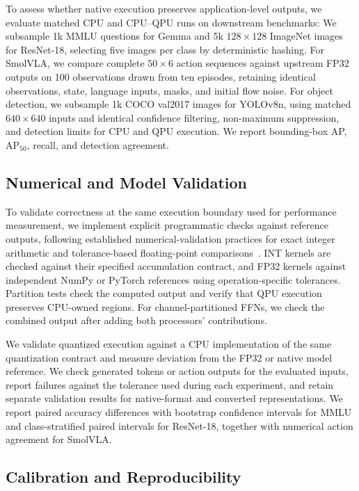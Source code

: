 \documentclass[sigplan,screen,review]{acmart}
\begin{document}
To assess whether native execution preserves application-level outputs, we evaluate matched CPU and CPU--QPU runs on downstream benchmarks: We subsample 1k MMLU questions for Gemma and 5k $128\times128$ ImageNet images for ResNet-18, selecting five images per class by deterministic hashing. For SmolVLA, we compare complete $50\times6$ action sequences against upstream FP32 outputs on 100 observations drawn from ten episodes, retaining identical observations, state, language inputs, masks, and initial flow noise. For object detection, we subsample 1k COCO val2017 images for YOLOv8n, using matched $640\times640$ inputs and identical confidence filtering, non-maximum suppression, and detection limits for CPU and QPU execution. We report bounding-box AP, AP$_{50}$, recall, and detection agreement.



\subsection{Numerical and Model Validation}

To validate correctness at the same execution boundary used for performance measurement, we implement explicit programmatic checks against reference outputs, following established numerical-validation practices for exact integer arithmetic and tolerance-based floating-point comparisons~\cite{pytorchtesting,pytorchnumerics}. INT kernels are checked against their specified accumulation contract, and FP32 kernels against independent NumPy or PyTorch references using operation-specific tolerances. Partition tests check the computed output and verify that QPU execution preserves CPU-owned regions. For channel-partitioned FFNs, we check the combined output after adding both processors' contributions. 

We validate quantized execution against a CPU implementation of the same quantization contract and measure deviation from the FP32 or native model reference. We check generated tokens or action outputs for the evaluated inputs, report failures against the tolerance used during each experiment, and retain separate validation results for native-format and converted representations. We report paired accuracy differences with bootstrap confidence intervals for MMLU and class-stratified paired intervals for ResNet-18, together with numerical action agreement for SmolVLA.

\subsection{Calibration and Reproducibility}
\end{document}
